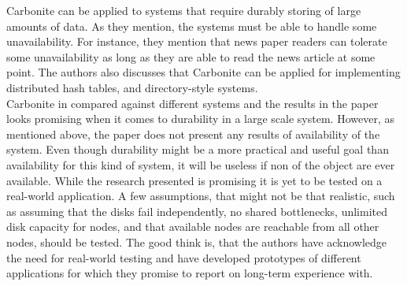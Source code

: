 \documentclass{article}
\begin{document}
\noindent Carbonite can be applied to systems that require durably storing of large amounts of data. As they mention, the systems must be able to handle some unavailability. For instance, they mention that news paper readers can tolerate some unavailability as long as they are able to read the news article at some point. The authors also discusses that Carbonite can be applied for implementing distributed hash tables, and directory-style systems.\\

\noindent Carbonite in compared against different systems and the results in the paper looks promising when it comes to durability in a large scale system. However, as mentioned above, the paper does not present any results of availability of the system. Even though durability might be a more practical and useful goal than availability for this kind of system, it will be useless if non of the object are ever available. While the research presented is promising it is yet to be tested on a real-world application. A few assumptions, that might not be that realistic, such as assuming that the disks fail independently, no shared bottlenecks, unlimited disk capacity for nodes, and that available nodes are reachable from all other nodes, should be tested. The good think is, that the authors have acknowledge the need for real-world testing and have developed prototypes of different applications for which they promise to report on long-term experience with.\\
\end{document}
